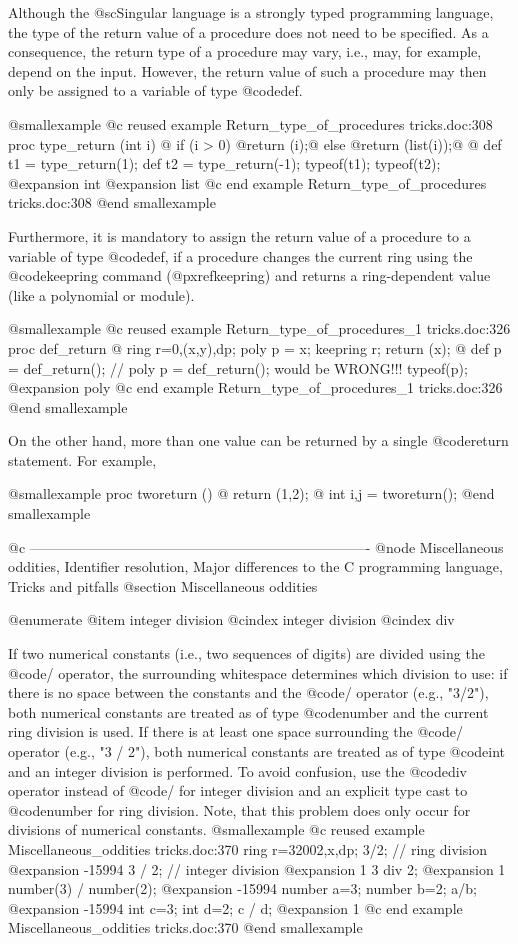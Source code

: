 Although the @sc{Singular} language is a strongly typed programming
language, the type of the
return value of a procedure does not need to be specified. As a
consequence, the return type of a procedure may vary, i.e., may, for
example, depend on the input. However, the return value
of such a procedure may then only be assigned to a variable of type
@code{def}.

@smallexample
@c reused example Return_type_of_procedures tricks.doc:308 
proc type_return (int i)
@{
  if (i > 0) @{return (i);@}
  else @{return (list(i));@}
@}
def t1 = type_return(1);
def t2 = type_return(-1);
typeof(t1); typeof(t2);
@expansion{} int
@expansion{} list
@c end example Return_type_of_procedures tricks.doc:308
@end smallexample

Furthermore, it is mandatory to assign the return value of a procedure
to a variable of type @code{def}, if a procedure changes the current
ring using the @code{keepring} command (@pxref{keepring}) and returns a
ring-dependent value (like a polynomial or module).

@smallexample
@c reused example Return_type_of_procedures_1 tricks.doc:326 
proc def_return
@{
  ring r=0,(x,y),dp;
  poly p = x;
  keepring r;
  return (x);
@}
def p = def_return();
// poly p = def_return(); would be WRONG!!!
typeof(p);
@expansion{} poly
@c end example Return_type_of_procedures_1 tricks.doc:326
@end smallexample

On the other hand, more than one value can be returned by a single
@code{return} statement. For example,

@smallexample
proc tworeturn () @{ return (1,2); @}
int i,j = tworeturn();
@end smallexample


@c -------------------------------------------------------------------------
@node Miscellaneous oddities, Identifier resolution, Major differences to the C programming language, Tricks and pitfalls
@section Miscellaneous oddities

@enumerate
@item integer division
@cindex integer division
@cindex div

If two numerical constants (i.e., two sequences of digits) are divided
using the @code{/} operator, the surrounding whitespace determines
which division to use: if there is no space between the constants and
the @code{/} operator (e.g., "3/2"), both numerical constants are
treated as of type @code{number} and the current ring division is
used. If there is at least one space surrounding the @code{/} operator
(e.g., "3 / 2"), both numerical constants are treated as of type
@code{int} and an integer division is performed. To avoid confusion, use
the @code{div} operator instead of @code{/} for integer division and an
explicit type cast to @code{number} for ring division. Note, that this
problem does only occur for divisions of numerical constants.
@smallexample
@c reused example Miscellaneous_oddities tricks.doc:370 
  ring r=32002,x,dp;
  3/2;    // ring division
@expansion{} -15994
  3 / 2;  // integer division
@expansion{} 1
  3 div 2;
@expansion{} 1
  number(3) / number(2);
@expansion{} -15994
  number a=3;
  number b=2;
  a/b;
@expansion{} -15994
  int c=3;
  int d=2;
  c / d;
@expansion{} 1
@c end example Miscellaneous_oddities tricks.doc:370
@end smallexample


